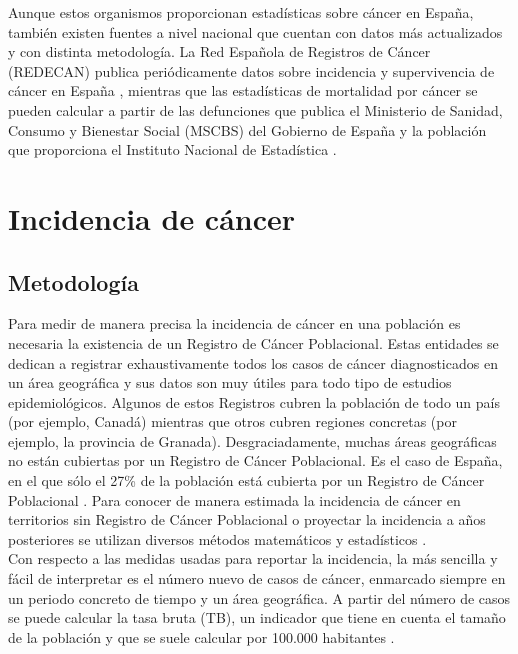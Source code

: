 Aunque estos organismos proporcionan estadísticas sobre cáncer en España, también existen fuentes a nivel nacional que cuentan con datos más actualizados y con distinta metodología. La Red Española de Registros de Cáncer (REDECAN) publica periódicamente datos sobre incidencia y supervivencia de cáncer en España \cite{REDECAN2020, Guevara2019}, mientras que las estadísticas de mortalidad por cáncer se pueden calcular a partir de las defunciones que publica el Ministerio de Sanidad, Consumo y Bienestar Social (MSCBS) del Gobierno de España \cite{MSCBS} y la población que proporciona el Instituto Nacional de Estadística \cite{INEpob}.


\section{Incidencia de cáncer}

\subsection{Metodología}

Para medir de manera precisa la incidencia de cáncer en una población es necesaria la existencia de un Registro de Cáncer Poblacional. Estas entidades se dedican a registrar exhaustivamente todos los casos de cáncer diagnosticados en un área geográfica y sus datos son muy útiles para todo tipo de estudios epidemiológicos. Algunos de estos Registros cubren la población de todo un país (por ejemplo, Canadá) mientras que otros cubren regiones concretas (por ejemplo, la provincia de Granada). Desgraciadamente, muchas áreas geográficas no están cubiertas por un Registro de Cáncer Poblacional. Es el caso de España, en el que sólo el 27\% de la población está cubierta por un Registro de Cáncer Poblacional \cite{Redondo-Sanchez2019}. Para conocer de manera estimada la incidencia de cáncer en territorios sin Registro de Cáncer Poblacional o proyectar la incidencia a años posteriores se utilizan diversos métodos matemáticos y estadísticos \cite{Bray2018, GCO, ECIS, ECIS2, REDECAN2020, Redondo-Sanchez2019}.\\

Con respecto a las medidas usadas para reportar la incidencia, la más sencilla y fácil de interpretar es el número nuevo de casos de cáncer, enmarcado siempre en un periodo concreto de tiempo y un área geográfica. A partir del número de casos se puede calcular la tasa bruta (TB), un indicador que tiene en cuenta el tamaño de la población y que se suele calcular por 100.000 habitantes \cite{IARC1995}.\\

